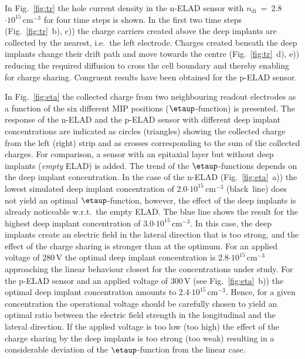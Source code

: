 \documentclass[a4paper,11pt]{article}
\begin{document}
In Fig.~\ref{fig:tr} the hole current density in the n-ELAD sensor with $n\mathrm{_{di}}$~=~2.8$\mathrm{\cdot10^{15}\,cm^{-3}}$ for four time steps is shown.
In the first two time steps (Fig.~\ref{fig:tr}~b), c)) the charge carriers created above the deep implants are collected by the nearest, i.e.\ the left electrode.
Charges created beneath the deep implants change their drift path and move towards the centre (Fig.~\ref{fig:tr}~d), e)) reducing the required diffusion to cross the cell boundary
 and thereby enabling for charge sharing.
Congruent results have been obtained for the p-ELAD sensor.

In Fig.~\ref{fig:eta} the collected charge from two neighbouring readout electrodes as a function of the six different MIP positions ($\etaup$-function) is presented.
The response of the n-ELAD and the p-ELAD sensor with different deep implant concentrations are indicated as
 circles (triangles) showing the collected charge from the left (right) strip
 and as crosses corresponding to the sum of the collected charges. 
For comparison, a sensor with an epitaxial layer but without deep implants (\textit{empty} ELAD) is added. 
The trend of the $\etaup$-functions depends on the deep implant concentration.
In the case of the n-ELAD (Fig.~\ref{fig:eta}~a)) the lowest simulated deep implant concentration of 2.0$\mathrm{\cdot10^{15}\,cm^{-3}}$ (black~line) does not yield an optimal $\etaup$-function,
 however, the effect of the deep implants is already noticeable w.r.t.\ the empty ELAD. 
The blue line shows the result for the highest deep implant concentration of 3.0$\mathrm{\cdot10^{15}\,cm^{-3}}$. 
In this case, the deep implants create an electric field in the lateral direction that is too strong, and the effect of the charge sharing is stronger than at the optimum.
For an applied voltage of 280\,V the optimal deep implant concentration is 2.8$\mathrm{\cdot10^{15}\,cm^{-3}}$ approaching the linear behaviour closest for the concentrations under study.
For the p-ELAD sensor and an applied voltage of 300\,V (see Fig.~\ref{fig:eta}~b)) the optimal deep implant concentration amounts to 2.4$\mathrm{\cdot10^{15}\,cm^{-3}}$.
Hence, for a given concentration the operational voltage should be carefully chosen to yield an optimal ratio between the electric field strength in the longitudinal and the lateral direction. 
If the applied voltage is too low (too high) the effect of the charge sharing by the deep implants is too strong (too weak) resulting in a considerable deviation of the $\etaup$-function from the linear case.
\end{document}
